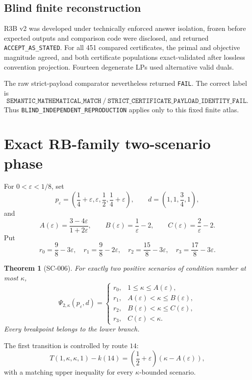 \documentclass[11pt]{article}
\newtheorem{theorem}{Theorem}[section]
\theoremstyle{remark}
\newcommand{\eps}{\varepsilon}
\begin{document}
\subsection{Blind finite reconstruction}

R3B v2 was developed under technically enforced answer isolation, frozen
before expected outputs and comparison code were disclosed, and returned
\texttt{ACCEPT\_AS\_STATED}. For all 451 compared certificates, the primal and
objective magnitude agreed, and both certificate populations exact-validated after lossless
convention projection. Fourteen degenerate LPs used alternative valid duals.

The raw strict-payload comparator nevertheless returned \texttt{FAIL}.
The correct label is
\[
\boxed{\texttt{SEMANTIC\_MATHEMATICAL\_MATCH}\ /\ 
\texttt{STRICT\_CERTIFICATE\_PAYLOAD\_IDENTITY\_FAIL}.}
\tag{4.6}
\]
Thus \texttt{BLIND\_INDEPENDENT\_REPRODUCTION} applies only to this fixed
finite atlas.

\section{Exact RB-family two-scenario phase}

For $0<\eps<1/8$, set
\[
p_\eps=\left(\frac14+\eps,\eps,\frac12,\frac14+\eps\right),
\qquad d=\left(1,1,\frac34,1\right),
\tag{5.1}
\]
and
\[
A(\eps)=\frac{3-4\eps}{1+2\eps},\qquad
B(\eps)=\frac1\eps-2,\qquad
C(\eps)=\frac2\eps-2.
\tag{5.2}
\]
Put
\[
r_0=\frac98-3\eps,\quad
r_1=\frac98-2\eps,\quad
r_2=\frac{15}{8}-3\eps,\quad
r_3=\frac{17}{8}-3\eps.
\tag{5.3}
\]

\begin{theorem}[SC-006]\label{thm:sc006}
For exactly two positive scenarios of condition number at most $\kappa$,
\[
\Psi_{2,\kappa}(p_\eps,d)=
\begin{cases}
r_0,&1\le\kappa\le A(\eps),\\
r_1,&A(\eps)<\kappa\le B(\eps),\\
r_2,&B(\eps)<\kappa\le C(\eps),\\
r_3,&C(\eps)<\kappa.
\end{cases}
\tag{5.4}
\]
Every breakpoint belongs to the lower branch.
\end{theorem}

The first transition is controlled by route $14$:
\[
T(1,\kappa,\kappa,1)-k(14)
=\left(\frac12+\eps\right)(\kappa-A(\eps)),
\tag{5.5}
\]
with a matching upper inequality for every $\kappa$-bounded scenario.
\end{document}
